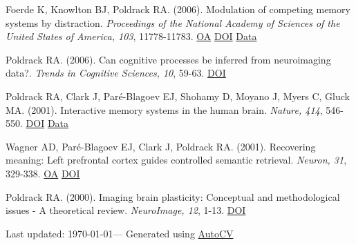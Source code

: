 \documentclass[10pt, letterpaper]{article}
\begin{document}
Foerde K, Knowlton BJ, Poldrack RA.  (2006). Modulation of competing memory systems by distraction. \textit{Proceedings of the National Academy of Sciences of the United States of America, 103}, 11778-11783. \href{https://www.ncbi.nlm.nih.gov/pmc/articles/PMC1544246}{OA} \href{https://doi.org/10.1073/pnas.0602659103}{DOI} \href{https://openneuro.org/datasets/ds000011/versions/00001}{Data} \vspace{2mm}

Poldrack RA.  (2006). Can cognitive processes be inferred from neuroimaging data?. \textit{Trends in Cognitive Sciences, 10}, 59-63. \href{https://doi.org/10.1016/j.tics.2005.12.004}{DOI} \vspace{2mm}

Poldrack RA, Clark J, Paré-Blagoev EJ, Shohamy D, Moyano J, Myers C, Gluck MA.  (2001). Interactive memory systems in the human brain. \textit{Nature, 414}, 546-550. \href{https://doi.org/10.1038/35107080}{DOI} \href{https://openneuro.org/datasets/ds000052/versions/00001}{Data} \vspace{2mm}

Wagner AD, Paré-Blagoev EJ, Clark J, Poldrack RA.  (2001). Recovering meaning: Left prefrontal cortex guides controlled semantic retrieval. \textit{Neuron, 31}, 329-338. \href{https://doi.org/10.1016/s0896-6273(01)00359-2}{OA} \href{https://doi.org/10.1016/s0896-6273(01)00359-2}{DOI} \vspace{2mm}

Poldrack RA.  (2000). Imaging brain plasticity: Conceptual and methodological issues - A theoretical review. \textit{NeuroImage, 12}, 1-13. \href{https://doi.org/10.1006/nimg.2000.0596}{DOI} \vspace{2mm}




\begin{center}
{\footnotesize Last updated: \today — Generated using \href{https://github.com/poldrack/autoCV}{AutoCV} 
}
\end{center}
\end{document}
